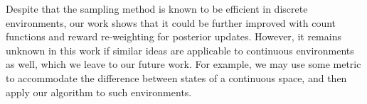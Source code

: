 \documentclass{article}
\theoremstyle{plain}
\theoremstyle{definition}
\theoremstyle{remark}
\begin{document}
Despite that the sampling method is known to be efficient in discrete environments, our work shows that it could be further improved with count functions and reward re-weighting for posterior updates. However, it remains unknown in this work if similar ideas are applicable to continuous environments as well, which we leave to our future work. For example, we may use some metric to accommodate the difference between states of a continuous space, and then apply our algorithm to such environments.






\appendix
\onecolumn



\end{document}
